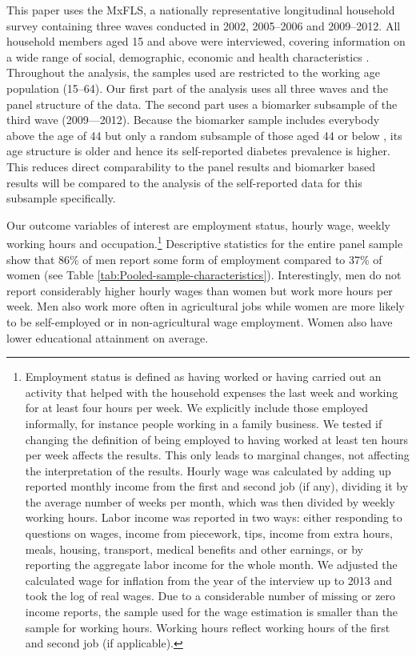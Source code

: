 \documentclass[12pt,english]{article}
\begin{document}
This paper uses the \acf{MxFLS}, a nationally representative longitudinal household survey containing three waves conducted in 2002, 2005--2006 and 2009--2012. All household members aged 15 and above were interviewed, covering information on a wide range of social, demographic, economic and health characteristics \parencite{Rubalcava2013}. Throughout the analysis, the samples used are restricted to the working age population (15--64). Our first part of the analysis uses all three waves and the panel structure of the data. The second part uses a biomarker subsample of the third wave (2009---2012). Because the biomarker sample includes everybody above the age of 44 but only a random subsample of those aged 44 or below \parencite{Crimmins2015}, its age structure is older and hence its self-reported diabetes prevalence is higher. This reduces direct comparability to the panel results and biomarker based results will be compared to the analysis of the self-reported data for this subsample specifically.

Our outcome variables of interest are employment status, hourly wage, weekly working hours and occupation.\footnote{Employment status is defined as having worked or having carried out an activity that helped with the household expenses the last week and working for at least four hours per week. We explicitly include those employed informally, for instance people working in a family business. We tested if changing the definition of being employed to having worked at least ten hours per week affects the results. This only leads to marginal changes, not affecting the interpretation of the results. Hourly wage was calculated by adding up reported monthly income from the first and second job (if any), dividing it by the average number of weeks per month, which was then divided by weekly working hours. Labor income was reported in two ways: either responding to questions on wages, income from piecework, tips, income from extra hours, meals, housing, transport, medical benefits and other earnings, or by reporting the aggregate labor income for the whole month. We adjusted the calculated wage for inflation from the year of the interview up to 2013 and took the log of real wages.  Due to a considerable number of missing or zero income reports, the sample used for the wage estimation is smaller than the sample for working hours. Working hours reflect working hours of the first and second job (if applicable).} Descriptive statistics for the entire panel sample show that 86\% of men report some form of employment compared to 37\% of women (see Table \ref{tab:Pooled-sample-characteristics}). Interestingly, men do not report considerably higher hourly wages than women but work more hours per week. Men also work more often in agricultural jobs while women are more likely to be self-employed or in non-agricultural wage employment. Women also have lower educational attainment on average.
\end{document}
